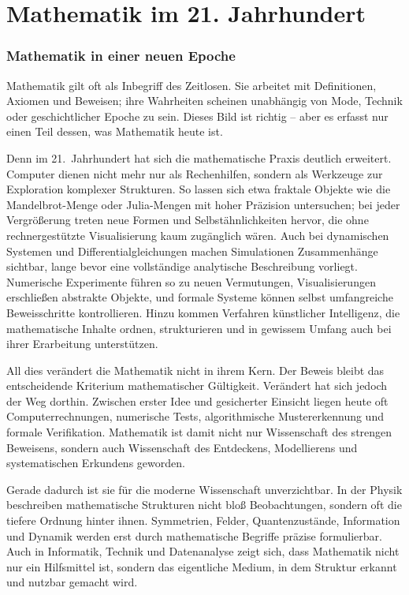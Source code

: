 \chapter{Mathematik im 21. Jahrhundert}
\label{chap:IX_21jh}


\subsection{Mathematik in einer neuen Epoche}

Mathematik gilt oft als Inbegriff des Zeitlosen. Sie arbeitet mit Definitionen, Axiomen und Beweisen; ihre Wahrheiten scheinen unabhängig von Mode, Technik oder geschichtlicher Epoche zu sein. Dieses Bild ist richtig -- aber es erfasst nur einen Teil dessen, was Mathematik heute ist.

Denn im 21.~Jahrhundert hat sich die mathematische Praxis deutlich erweitert. Computer dienen nicht mehr nur als Rechenhilfen, sondern als Werkzeuge zur Exploration komplexer Strukturen. So lassen sich etwa fraktale Objekte wie die Mandelbrot-Menge oder Julia-Mengen mit hoher Präzision untersuchen; bei jeder Vergrößerung treten neue Formen und Selbstähnlichkeiten hervor, die ohne rechnergestützte Visualisierung kaum zugänglich wären. Auch bei dynamischen Systemen und Differentialgleichungen machen Simulationen Zusammenhänge sichtbar, lange bevor eine vollständige analytische Beschreibung vorliegt. Numerische Experimente führen so zu neuen Vermutungen, Visualisierungen erschließen abstrakte Objekte, und formale Systeme können selbst umfangreiche Beweisschritte kontrollieren. Hinzu kommen Verfahren künstlicher Intelligenz, die mathematische Inhalte ordnen, strukturieren und in gewissem Umfang auch bei ihrer Erarbeitung unterstützen.

All dies verändert die Mathematik nicht in ihrem Kern. Der Beweis bleibt das entscheidende Kriterium mathematischer Gültigkeit. Verändert hat sich jedoch der Weg dorthin. Zwischen erster Idee und gesicherter Einsicht liegen heute oft Computerrechnungen, numerische Tests, algorithmische Mustererkennung und formale Verifikation. Mathematik ist damit nicht nur Wissenschaft des strengen Beweisens, sondern auch Wissenschaft des Entdeckens, Modellierens und systematischen Erkundens geworden.

Gerade dadurch ist sie für die moderne Wissenschaft unverzichtbar. In der Physik beschreiben mathematische Strukturen nicht bloß Beobachtungen, sondern oft die tiefere Ordnung hinter ihnen. Symmetrien, Felder, Quantenzustände, Information und Dynamik werden erst durch mathematische Begriffe präzise formulierbar. Auch in Informatik, Technik und Datenanalyse zeigt sich, dass Mathematik nicht nur ein Hilfsmittel ist, sondern das eigentliche Medium, in dem Struktur erkannt und nutzbar gemacht wird.

